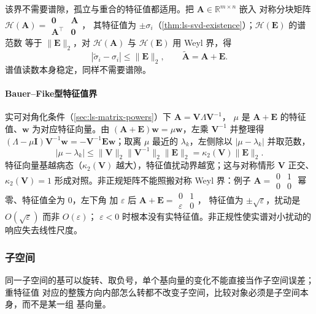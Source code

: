 该界不需要谱隙，孤立与重合的特征值都适用。把 $\bm A\in\mathbb R^{m\times n}$ 嵌入
对称分块矩阵 $\mathcal H(\bm A)=\begin{smallmatrix}\bm0&\bm A\\\bm A^\top&\bm0\end{smallmatrix}$，
其特征值为 $\pm\sigma_i$（\ref{thm:ls-svd-existence}）；$\mathcal H(\bm E)$ 的谱范数
等于 $\lVert\bm E\rVert_2$，对 $\mathcal H(\bm A)$ 与 $\mathcal H(\bm E)$ 用 Weyl
界，得
\begin{equation}
 |\widetilde\sigma_i-\sigma_i|\leq\lVert\bm E\rVert_2,
 \qquad \widetilde{\bm A}=\bm A+\bm E.
 \label{eq:matrix-analysis-singular-value-perturbation}
\end{equation}
谱值读数本身稳定，同样不需要谱隙。

\paragraph{Bauer--Fike型特征值界}

实可对角化条件（\ref{sec:ls-matrix-powers}）下 $\bm A=\bm V\Lambda\bm V^{-1}$，
$\mu$ 是 $\bm A+\bm E$ 的特征值、$\bm w$ 为对应特征向量。由
$(\bm A+\bm E)\bm w=\mu\bm w$，左乘 $\bm V^{-1}$ 并整理得
$(\Lambda-\mu\bm I)\bm V^{-1}\bm w=-\bm V^{-1}\bm E\bm w$；取离 $\mu$ 最近的
$\lambda_k$，左侧除以 $|\mu-\lambda_k|$ 并取范数，
\[
 |\mu-\lambda_k|
 \leq\lVert\bm V\rVert_2\lVert\bm V^{-1}\rVert_2\lVert\bm E\rVert_2
 =\kappa_2(\bm V)\lVert\bm E\rVert_2.
\]
特征向量基越病态（$\kappa_2(\bm V)$ 越大），特征值扰动界越宽；这与对称情形
$\bm V$ 正交、$\kappa_2(\bm V)=1$ 形成对照。非正规矩阵不能照搬对称 Weyl 界：例子
$\bm A=\begin{smallmatrix}0&1\\0&0\end{smallmatrix}$ 幂零、特征值全为 $0$，左下角
加 $\varepsilon$ 后 $\bm A+\bm E=\begin{smallmatrix}0&1\\\varepsilon&0\end{smallmatrix}$，
特征值为 $\pm\sqrt\varepsilon$，扰动是 $O(\sqrt\varepsilon)$ 而非 $O(\varepsilon)$；
$\varepsilon<0$ 时根本没有实特征值。非正规性使实谱对小扰动的响应失去线性尺度。

\subsubsection{子空间}
\label{sec:ls-subspace-sensitivity}

同一子空间的基可以旋转、取负号，单个基向量的变化不能直接当作子空间误差；重特征值
对应的整簇方向内部怎么转都不改变子空间，比较对象必须是子空间本身，而不是某一组
基向量。

